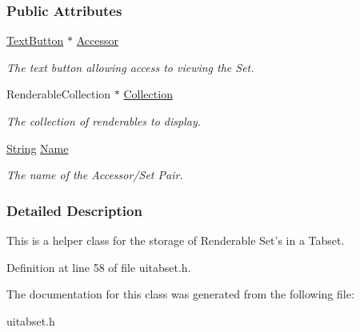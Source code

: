 \subsubsection*{Public Attributes}
\begin{DoxyCompactItemize}
\item 
\hypertarget{structMezzanine_1_1UI_1_1RenderableSetData_a748d426667cc79f9d9abbbdeeaf1c742}{
\hyperlink{classMezzanine_1_1UI_1_1TextButton}{TextButton} $\ast$ \hyperlink{structMezzanine_1_1UI_1_1RenderableSetData_a748d426667cc79f9d9abbbdeeaf1c742}{Accessor}}
\label{structMezzanine_1_1UI_1_1RenderableSetData_a748d426667cc79f9d9abbbdeeaf1c742}

\begin{DoxyCompactList}\small\item\em The text button allowing access to viewing the Set. \item\end{DoxyCompactList}\item 
\hypertarget{structMezzanine_1_1UI_1_1RenderableSetData_a35dddda517f77cbbb31eea781d7f9874}{
RenderableCollection $\ast$ \hyperlink{structMezzanine_1_1UI_1_1RenderableSetData_a35dddda517f77cbbb31eea781d7f9874}{Collection}}
\label{structMezzanine_1_1UI_1_1RenderableSetData_a35dddda517f77cbbb31eea781d7f9874}

\begin{DoxyCompactList}\small\item\em The collection of renderables to display. \item\end{DoxyCompactList}\item 
\hypertarget{structMezzanine_1_1UI_1_1RenderableSetData_a0e3c6ae9e62b7ab042613a3934d3d16a}{
\hyperlink{namespaceMezzanine_acf9fcc130e6ebf08e3d8491aebcf1c86}{String} \hyperlink{structMezzanine_1_1UI_1_1RenderableSetData_a0e3c6ae9e62b7ab042613a3934d3d16a}{Name}}
\label{structMezzanine_1_1UI_1_1RenderableSetData_a0e3c6ae9e62b7ab042613a3934d3d16a}

\begin{DoxyCompactList}\small\item\em The name of the Accessor/Set Pair. \item\end{DoxyCompactList}\end{DoxyCompactItemize}


\subsubsection{Detailed Description}
This is a helper class for the storage of Renderable Set's in a Tabset. 

Definition at line 58 of file uitabset.h.



The documentation for this class was generated from the following file:\begin{DoxyCompactItemize}
\item 
uitabset.h\end{DoxyCompactItemize}
